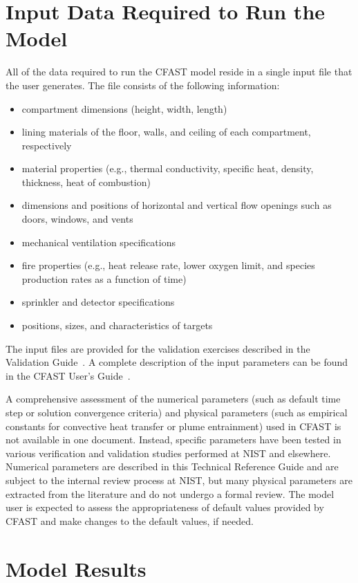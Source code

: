 \documentclass[12pt,twoside]{book}
\begin{document}
\section{Input Data Required to Run the Model}

All of the data required to run the CFAST model reside in a single input file that the user generates. The file consists of the following information:
\begin{itemize}
\item compartment dimensions (height, width, length)
\item lining materials of the floor, walls, and ceiling of each compartment, respectively
\item material properties (e.g., thermal conductivity, specific heat, density, thickness, heat of combustion)
\item dimensions and positions of horizontal and vertical flow openings such as doors, windows, and vents
\item mechanical ventilation specifications
\item fire properties (e.g., heat release rate, lower oxygen limit, and species production rates as a function of time)
\item sprinkler and detector specifications
\item positions, sizes, and characteristics of targets
\end{itemize}
The input files are provided for the validation exercises described in the Validation Guide~\cite{CFAST_Valid_Guide_7}. A complete description of the input parameters can be found in the CFAST User's Guide~\cite{CFAST_Users_Guide_7}.

A comprehensive assessment of the numerical parameters (such as default time step or solution convergence criteria) and physical parameters (such as empirical constants for convective heat transfer or plume entrainment) used in CFAST is not available in one document. Instead, specific parameters have been tested in various verification and validation studies performed at NIST and elsewhere. Numerical parameters are described in this Technical Reference Guide and are subject to the internal review process at NIST, but many physical parameters are extracted from the literature and do not undergo a formal review. The model user is expected to assess the appropriateness of default values provided by CFAST and make changes to the default values, if needed.



\section{Model Results}
\end{document}
